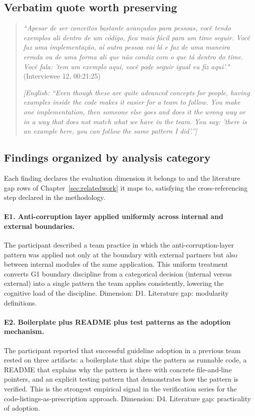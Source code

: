\subsection*{Verbatim quote worth preserving}

\begin{quote}
\emph{``Apesar de ser conceitos bastante avan\c{c}ados para pessoas, voc\^e tendo exemplos ali dentro de um c\'odigo, fica mais f\'acil para um time seguir. Voc\^e faz uma implementa\c{c}\~ao, a\'i outra pessoa vai l\'a e faz de uma maneira errada ou de uma forma ali que n\~ao condiz com o que t\'a dentro do time. Voc\^e fala: 'tem um exemplo aqui, voc\^e pode seguir igual eu fiz aqui'."} (Interviewee 12, 00:21:25)

\emph{[English: ``Even though these are quite advanced concepts for people, having examples inside the code makes it easier for a team to follow. You make one implementation, then someone else goes and does it the wrong way or in a way that does not match what we have in the team. You say: 'there is an example here, you can follow the same pattern I did'.'']}
\end{quote}

\subsection*{Findings organized by analysis category}

Each finding declares the evaluation dimension it belongs to and the literature gap rows of Chapter~\ref{sec:relatedwork} it maps to, satisfying the cross-referencing step declared in the methodology.

\paragraph*{E1. Anti-corruption layer applied uniformly across internal and external boundaries.} The participant described a team practice in which the anti-corruption-layer pattern was applied not only at the boundary with external partners but also between internal modules of the same application. This uniform treatment converts G1 boundary discipline from a categorical decision (internal versus external) into a single pattern the team applies consistently, lowering the cognitive load of the discipline. Dimension: D1. Literature gap: modularity definitions.

\paragraph*{E2. Boilerplate plus README plus test patterns as the adoption mechanism.} The participant reported that successful guideline adoption in a previous team rested on three artifacts: a boilerplate that ships the pattern as runnable code, a README that explains why the pattern is there with concrete file-and-line pointers, and an explicit testing pattern that demonstrates how the pattern is verified. This is the strongest empirical signal in the verification series for the code-listings-as-prescription approach. Dimension: D4. Literature gap: practicality of adoption.

